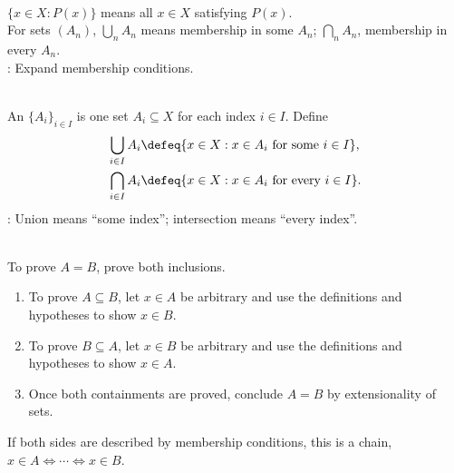 \begin{remark} \label{rem:set-builder-notation} \\
$\{x\in X:P(x)\}$ means all $x\in X$ satisfying $P(x)$.\\
For sets $(A_n)$, $\bigcup_nA_n$ means membership in some $A_n$; $\bigcap_nA_n$, membership in every $A_n$.\\
: Expand membership conditions.
\end{remark}

\begin{definition} \label{def:indexed-families-unions-intersections} \\
An  $\{A_i\}_{i\in I}$ is one set $A_i\subseteq X$ for each index $i\in I$. Define
\begin{align}
\bigcup_{i\in I}A_i&\defeq\{x\in X:x\in A_i\text{ for some }i\in I\}, \nonumber\\
\bigcap_{i\in I}A_i&\defeq\{x\in X:x\in A_i\text{ for every }i\in I\}. \nonumber
\end{align}
: Union means ``some index''; intersection means ``every index''.
\end{definition}

\begin{method} \label{meth:proof-by-containment} \\
To prove $A=B$, prove both inclusions.
\begin{enumerate}[label=(\roman*)]
\setlength{\itemsep}{0pt}
\item To prove $A\subseteq B$, let $x\in A$ be arbitrary and use the definitions and hypotheses to show $x\in B$.
\item To prove $B\subseteq A$, let $x\in B$ be arbitrary and use the definitions and hypotheses to show $x\in A$.
\item Once both containments are proved, conclude $A=B$ by extensionality of sets.
\end{enumerate}
If both sides are described by membership conditions, this is a chain, $x\in A \Longleftrightarrow \cdots \Longleftrightarrow x\in B$.
\end{method}

